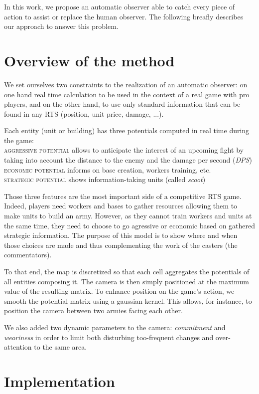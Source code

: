 \documentclass{jfsma}
\begin{document}
        In this work, we propose an automatic observer able to catch every piece of action to assist or replace the human observer. The following breafly describes our approach to answer this problem.
        
\section{Overview of the method}
We set ourselves two constraints to the realization of an automatic observer: on one hand real time calculation to be used in the context of a real game with pro players, and on the other hand, to use only standard information that can be found in any RTS (position, unit price, damage, ...).

Each entity (unit or building) has three potentials computed in real time during the game:\\
\textsc{aggressive potential} allows to anticipate the interest of an upcoming fight by taking into account the distance to the enemy and the damage per second (\emph{DPS})\\
\textsc{economic potential} informs on base creation, workers training, etc.\\
\textsc{strategic potential} shows information-taking units (called \emph{scoot}) 

Those three features are the most important side of a competitive RTS game.
Indeed, players need workers and bases to gather resources allowing them to make units to build an army.
However, as they cannot train workers and units at the same time, they need to choose to go agressive or economic based on gathered strategic information.
The purpose of this model is to show where and when those choices are made and thus complementing the work of the casters (the commentators).

To that end, the map is discretized so that each cell aggregates the potentials of all entities composing it. The camera is then simply positioned at the maximum value of the resulting matrix.
To enhance position on the game's action, we smooth the potential matrix using a gaussian kernel. 
This allows, for instance, to position the camera between two armies facing each other. 

We also added two dynamic parameters to the camera: \emph{commitment} and \emph{weariness} in order to limit both disturbing too-frequent changes and over-attention to the same area.

\section{Implementation}
\end{document}
